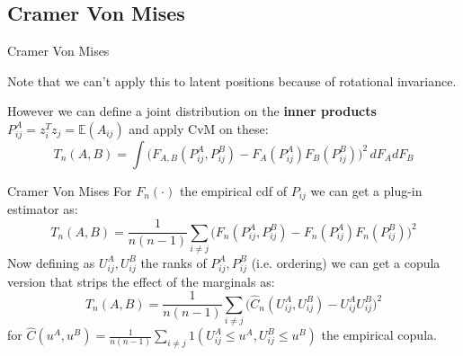 \documentclass[10.5pt]{beamer}
\begin{document}
\subsection{Cramer Von Mises}
\begin{frame}{Cramer Von Mises}

\pause 

Note that we can't apply this to latent positions because of rotational invariance.
\vspace{.5em}

However we can define a joint distribution on the \textbf{inner products} $P_{ij}^A=z_i^T z_j=\mathbb{E}(A_{ij})$ and apply CvM on these:
\[
T_n(A, B)=\int \Big(F_{A, B}(P_{ij}^A, P_{ij}^B) - F_A(P_{ij}^A)F_B(P_{ij}^B)\Big)^2 \, dF_AdF_B
\]
\end{frame}

\begin{frame}{Cramer Von Mises}
For $F_n(\cdot)$ the empirical cdf of $P_{ij}$ we can get a plug-in estimator as:
\[
T_n(A, B) =\frac{1}{n(n-1)} \sum_{i\neq j} \Big(F_{n}(P_{ij}^A, P_{ij}^B) - F_{n}(P_{ij}^A)F_{n}(P_{ij}^B)\Big)^2
\]
Now defining as $U^A_{ij},U^B_{ij}$ the ranks of $P^A_{ij}, P^B_{ij}$ (i.e. ordering) we can get a copula version that strips the effect of the marginals as:
\[
T_n(A, B) =\frac{1}{n(n-1)} \sum_{i\neq j} \Big(\hat{C}_n(U^A_{ij}, U^B_{ij}) - U^A_{ij}U^B_{ij}\Big)^2
\]
for $\hat{C}(u^A, u^B) = \frac{1}{n(n-1)}\sum_{i\neq j}1(U^A_{ij}\le u^A, U^B_{ij}\le u^B)$ the empirical copula.

\end{frame}

\end{document}
